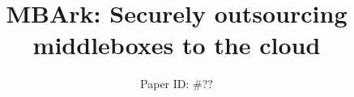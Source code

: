 \documentclass{sig-alternate}
\newcommand{\sys}{MBArk\xspace}
\begin{document}
%

\title{\sys: Securely outsourcing middleboxes to the cloud}

\subtitle{Paper ID: \#??}


%
%
%
%
%
\end{document}
